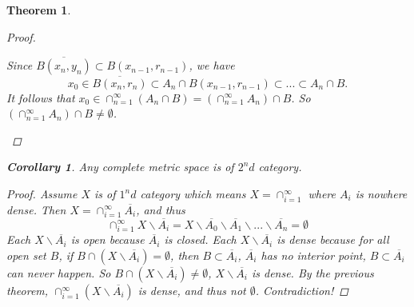 \documentclass{article}
\newtheorem*{corollary}{Corollary}
\newtheorem*{theorem}{Theorem}
\begin{document}
\begin{theorem}
\begin{proof}
\begin{itemize}
            Since $\overline{B(x_n, y_n)} \subset B(x_{n-1}, r_{n-1})$, we have 
            \[
                x_0 \in \overline{B(x_n, r_n)} \subset A_n \cap B(x_{n-1}, r_{n-1}) \subset ... \subset A_n \cap B.
            \]
            It follows that $x_0 \in \cap_{n=1}^{\infty}{(A_n \cap B)} = (\cap_{n=1}^{\infty}{A_n}) \cap B$.
            So $(\cap_{n=1}^{\infty}A_n) \cap B \ne \emptyset$.
        \end{itemize}
    \end{proof}
    \begin{corollary}
        Any complete metric space is of $2^nd$ category.
        \begin{proof}
            Assume $X$ is of $1^nd$ category which means $X=\cap_{i=1}^{\infty}$ where $A_i$ is nowhere dense.
            Then $X=\cap_{i=1}^{\infty}\overline{A_i}$, and thus 
            \[
                \cap_{i=1}^{\infty}{X \backslash \overline{A_i}} = X \backslash \overline{A_0} 
                                                                     \backslash \overline{A_1} 
                                                                     \backslash ...
                                                                     \backslash \overline{A_n} = \emptyset
            \]
            Each $X \backslash \overline{A_i}$ is open because $\overline{A_i}$ is closed.
            Each $X \backslash \overline{A_i}$ is dense because for all open set $B$, 
            if $B \cap (X \backslash \overline{A_i}) = \emptyset$, then $B \subset \overline{A_i}$,
            $\overline{A_i}$ has no interior point, $B \subset \overline{A_i}$ can never happen.
            So $B \cap (X \backslash \overline{A_i}) \ne \emptyset$, $X \backslash \overline{A_i}$ is dense.
            By the previous theorem, $\cap_{i=1}^{\infty}{(X \backslash \overline{A_i})}$ is dense, and thus not $\emptyset$.
            Contradiction!
        \end{proof}
    \end{corollary}
\end{theorem}
\end{document}

